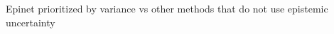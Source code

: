 \documentclass[preview]{standalone}
\begin{document}
\begin{center}
Epinet prioritized by variance vs other methods that do not use epistemic uncertainty
\end{center}
\end{document}
